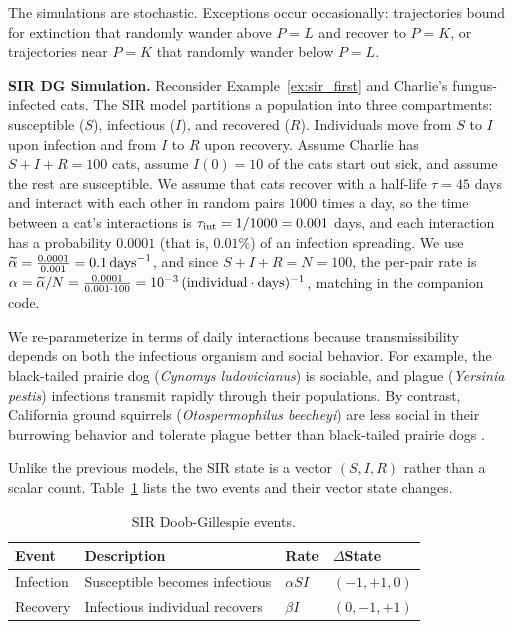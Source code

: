 \begin{example}
The simulations are stochastic. Exceptions occur occasionally: trajectories bound for extinction that randomly wander above $P=L$ and recover to $P=K$, or trajectories near $P=K$ that randomly wander below $P=L$.

\end{example}


\begin{example}\label{ex:sir_code}
\textbf{SIR DG Simulation.}
Reconsider Example~\ref{ex:sir_first} and Charlie's fungus-infected cats. The SIR model partitions a population into three compartments: susceptible ($S$), infectious ($I$), and recovered ($R$). Individuals move from $S$ to $I$ upon infection and from $I$ to $R$ upon recovery. Assume Charlie has $S + I + R = 100$ cats, assume $I(0) = 10$ of the cats start out sick, and assume the rest are susceptible. We assume that cats recover with a half-life $\tau = 45$ days and interact with each other in random pairs $1000$ times a day, so the time between a cat's interactions is $\tau_{\textup{int}} = 1/1000 = 0.001$ days, and each interaction has a probability $0.0001$ (that is, $0.01\%$) of an infection spreading.
We use $\widetilde{\alpha} = \frac{0.0001}{0.001} = 0.1\,\textup{days}^{-1}$, and since $S + I + R = N = 100$, the per-pair rate is $\alpha = \widetilde{\alpha}/N = \frac{0.0001}{0.001 \cdot 100} = 10^{-3}\,(\textup{individual}\cdot\textup{days})^{-1}$, matching \MakeSirRates{} in the companion code.

We re-parameterize in terms of daily interactions because transmissibility depends on both the infectious organism and social behavior. For example, the black-tailed prairie dog (\textit{Cynomys ludovicianus}) is sociable, and plague (\textit{Yersinia pestis}) infections transmit rapidly through their populations. By contrast, California ground squirrels (\textit{Otospermophilus beecheyi}) are less social in their burrowing behavior and tolerate plague better than black-tailed prairie dogs \cite{buhnerkempe2011transmission}.

Unlike the previous models, the SIR state is a vector $(S, I, R)$ rather than a scalar count. Table~\ref{tab:sir_dg_events} lists the two events and their vector state changes.

\begin{table}[htbp]
\centering
\caption{SIR Doob-Gillespie events.}\label{tab:sir_dg_events}
\begin{tabular}{llll}
\hline
Event & Description & Rate & $\Delta$State \\
\hline
Infection & Susceptible becomes infectious & $\alpha S I$ & $(-1,+1,0)$ \\
Recovery & Infectious individual recovers & $\beta I$ & $(0,-1,+1)$ \\
\hline
\end{tabular}
\end{table}


\end{example}
